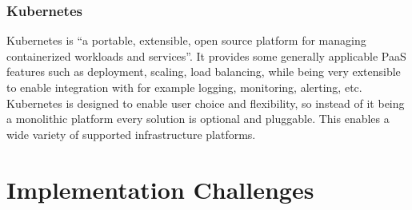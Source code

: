 \subsubsection*{Kubernetes}

Kubernetes is ``a portable, extensible, open source platform for managing
containerized workloads and services''. It provides some generally applicable
PaaS features such as deployment, scaling, load balancing, while being very
extensible to enable integration with for example logging, monitoring, alerting,
etc. Kubernetes is designed to enable user choice and flexibility, so instead of
it being a monolithic platform every solution is optional and pluggable. This
enables a wide variety of supported infrastructure platforms. 

\section{Implementation Challenges}
